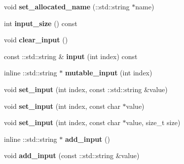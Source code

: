 \begin{DoxyCompactItemize}
void {\bfseries set\+\_\+allocated\+\_\+name} (\+::std\+::string $\ast$name)
\item 
\mbox{\label{classcaffe_1_1_net_parameter_af6a1abd8126e678973a954b793822230}} 
int {\bfseries input\+\_\+size} () const
\item 
\mbox{\label{classcaffe_1_1_net_parameter_a9e7c7021dba0aec83233f69b1bd178e0}} 
void {\bfseries clear\+\_\+input} ()
\item 
\mbox{\label{classcaffe_1_1_net_parameter_a5530dd170b7829df8da187681e638a3c}} 
const \+::std\+::string \& {\bfseries input} (int index) const
\item 
\mbox{\label{classcaffe_1_1_net_parameter_a2d9fac76781269a61d607e6e170b7106}} 
inline \+::std\+::string $\ast$ {\bfseries mutable\+\_\+input} (int index)
\item 
\mbox{\label{classcaffe_1_1_net_parameter_a0b707cd8fa8a453c4756219bdbdffb2b}} 
void {\bfseries set\+\_\+input} (int index, const \+::std\+::string \&value)
\item 
\mbox{\label{classcaffe_1_1_net_parameter_a88ae2a37d2eefb0b3a052c5ceaeecf36}} 
void {\bfseries set\+\_\+input} (int index, const char $\ast$value)
\item 
\mbox{\label{classcaffe_1_1_net_parameter_a532a9c5d643a5a6c216c7ad5f313c55b}} 
void {\bfseries set\+\_\+input} (int index, const char $\ast$value, size\+\_\+t size)
\item 
\mbox{\label{classcaffe_1_1_net_parameter_add6bc367adc07966d315f1a53e6e1277}} 
inline \+::std\+::string $\ast$ {\bfseries add\+\_\+input} ()
\item 
\mbox{\label{classcaffe_1_1_net_parameter_af7b82becb24d94145b0837cc5b2034f2}} 
void {\bfseries add\+\_\+input} (const \+::std\+::string \&value)
\item 
\mbox{\label{classcaffe_1_1_net_parameter_a93e0b3130ab33dfb4c9aa4bd80c32729}} 

\end{DoxyCompactItemize}
